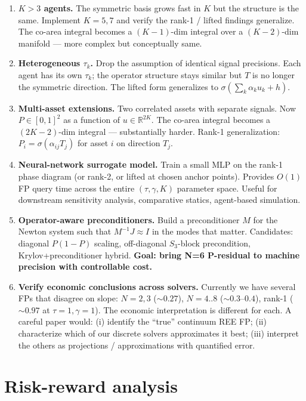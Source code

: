 \documentclass[11pt]{article}
\begin{document}
\begin{enumerate}
\item \textbf{$K > 3$ agents.} The symmetric basis grows fast in $K$ but the structure is
the same. Implement $K=5, 7$ and verify the rank-1 / lifted findings generalize. The
co-area integral becomes a $(K{-}1)$-dim integral over a $(K{-}2)$-dim manifold — more
complex but conceptually same.
\item \textbf{Heterogeneous $\tau_k$.} Drop the assumption of identical signal precisions.
Each agent has its own $\tau_k$; the operator structure stays similar but $T$ is no longer
the symmetric direction. The lifted form generalizes to $\sigma(\sum_k \alpha_k u_k + h)$.
\item \textbf{Multi-asset extensions.} Two correlated assets with separate signals. Now
$P\in[0,1]^2$ as a function of $u\in\mathbb R^{2K}$. The co-area integral becomes a
$(2K{-}2)$-dim integral — substantially harder. Rank-1 generalization: $P_i = \sigma(\alpha_{ij}T_j)$
for asset $i$ on direction $T_j$.
\item \textbf{Neural-network surrogate model.} Train a small MLP on the rank-1 phase
diagram (or rank-2, or lifted at chosen anchor points). Provides $O(1)$ FP query time
across the entire $(\tau, \gamma, K)$ parameter space. Useful for downstream sensitivity
analysis, comparative statics, agent-based simulation.
\item \textbf{Operator-aware preconditioners.} Build a preconditioner $M$ for the
Newton system such that $M^{-1}J \approx I$ in the modes that matter. Candidates:
diagonal $P(1-P)$ scaling, off-diagonal $S_3$-block precondition, Krylov+preconditioner
hybrid. \textbf{Goal: bring N=6 P-residual to machine precision with controllable cost.}
\item \textbf{Verify economic conclusions across solvers.} Currently we have several FPs
that disagree on slope: $N=2,3$ ($\sim 0.27$), $N=4..8$ ($\sim 0.3$--$0.4$), rank-1
($\sim 0.97$ at $\tau{=}1,\gamma{=}1$). The economic interpretation is different for each.
A careful paper would: (i) identify the ``true'' continuum REE FP; (ii) characterize
which of our discrete solvers approximates it best; (iii) interpret the others as
projections / approximations with quantified error.
\end{enumerate}

\section{Risk-reward analysis}
\end{document}
